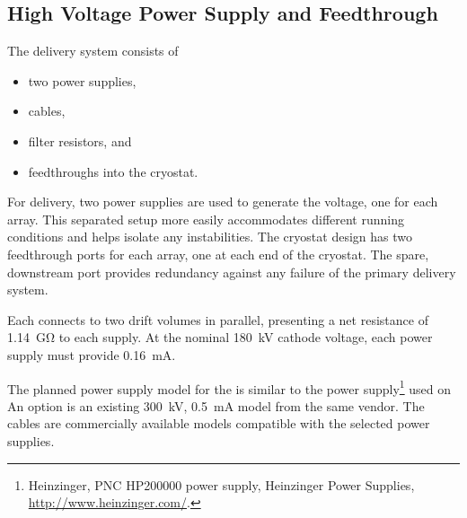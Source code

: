 \subsection {High Voltage Power Supply and Feedthrough}

The  delivery system consists of
\begin{itemize}
\item two power supplies,
\item {} cables,
\item filter resistors, and
\item {} feedthroughs into the cryostat.
\end{itemize}

For  delivery, two power supplies are used to generate the voltage, one for each  array. 
This separated setup more easily accommodates different running conditions and helps isolate any instabilities. %
The cryostat design has two feedthrough ports for each  array, one at each end of the cryostat. The spare, downstream port provides redundancy against any failure of the primary  delivery system. 

Each  connects to two drift volumes in parallel, presenting a net resistance of \SI{1.14}{\giga\ohm} to each supply. At the nominal \SI{180}{kV} cathode voltage, each power supply must provide \SI{0.16}{mA}.

The planned power supply model for the  is similar to the power supply\footnote{Heinzinger, PNC HP200000  power supply, Heinzinger\texttrademark{} Power Supplies, \url{http://www.heinzinger.com/}.} used on  %
An %
option is an existing \SI{300}{kV}, \SI{0.5}{mA} model from the same vendor.
The  cables are commercially available models compatible with the selected power supplies. 


